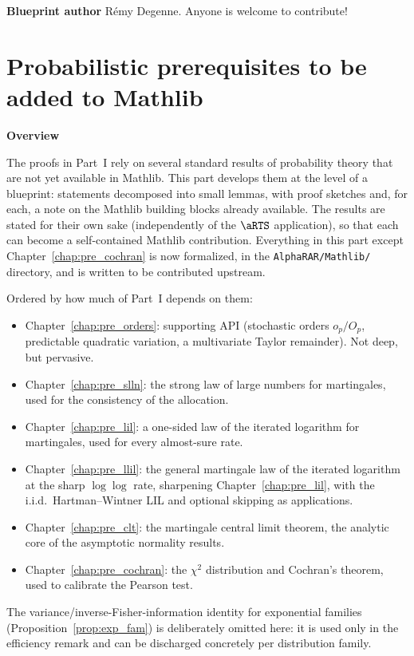 \textbf{Blueprint author} Rémy Degenne. Anyone is welcome to contribute!











\part{Probabilistic prerequisites to be added to Mathlib}
\label{part:prereq}

\textbf{Overview}

The proofs in Part~I rely on several standard results of probability theory that
are not yet available in Mathlib. This part develops them at the level of a
blueprint: statements decomposed into small lemmas, with proof sketches and, for
each, a note on the Mathlib building blocks already available. The results are
stated for their own sake (independently of the $\aRTS$ application), so that
each can become a self-contained Mathlib contribution. Everything in this part
except Chapter~\ref{chap:pre_cochran} is now formalized, in the
\texttt{AlphaRAR/Mathlib/} directory, and is written to be contributed upstream.

Ordered by how much of Part~I depends on them:
\begin{itemize}
  \item Chapter~\ref{chap:pre_orders}: supporting API (stochastic orders
        $o_p/O_p$, predictable quadratic variation, a multivariate Taylor
        remainder). Not deep, but pervasive.
  \item Chapter~\ref{chap:pre_slln}: the strong law of large numbers for
        martingales, used for the consistency of the allocation.
  \item Chapter~\ref{chap:pre_lil}: a one-sided law of the iterated logarithm for
        martingales, used for every almost-sure rate.
  \item Chapter~\ref{chap:pre_llil}: the general martingale law of the iterated
        logarithm at the sharp $\log\log$ rate, sharpening
        Chapter~\ref{chap:pre_lil}, with the i.i.d.\ Hartman--Wintner LIL and
        optional skipping as applications.
  \item Chapter~\ref{chap:pre_clt}: the martingale central limit theorem, the
        analytic core of the asymptotic normality results.
  \item Chapter~\ref{chap:pre_cochran}: the $\chi^2$ distribution and Cochran's
        theorem, used to calibrate the Pearson test.
\end{itemize}
The variance/inverse-Fisher-information identity for exponential families
(Proposition~\ref{prop:exp_fam}) is deliberately omitted here: it is used only in
the efficiency remark and can be discharged concretely per distribution family.








